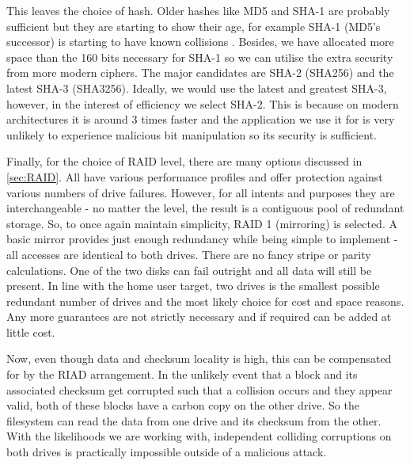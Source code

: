         This leaves the choice of hash. Older hashes like MD5 and SHA-1
        \cite{sha1} are probably sufficient but they are starting to show their
        age, for example SHA-1 (MD5's successor) is starting to have known
        collisions \cite{SHA_collision}. Besides, we have allocated more space
        than the 160 bits necessary for SHA-1 so we can utilise the extra
        security from more modern ciphers. The major candidates are SHA-2
        \cite{sha2_analysis} (SHA256) and the latest SHA-3 \cite{sha3}
        (SHA3256). Ideally, we would use the latest and greatest SHA-3, however,
        in the interest of efficiency we select SHA-2.  This is because on
        modern architectures it is around 3 times faster \cite{hash_stats} and
        the application we use it for is very unlikely to experience malicious
        bit manipulation so its security is sufficient.

        Finally, for the choice of RAID level, there are many options discussed in
        \autoref{sec:RAID}. All have various performance profiles and offer
        protection against various numbers of drive failures. However, for all
        intents and purposes they are interchangeable - no matter the level, the
        result is a contiguous pool of redundant storage. So, to once again
        maintain simplicity, RAID 1 (mirroring) is selected. A basic mirror
        provides just enough redundancy while being simple to implement - all
        accesses are identical to both drives. There are no fancy stripe or
        parity calculations. One of the two disks can fail outright and all
        data will still be present. In line with the home user target, two
        drives is the smallest possible redundant number of drives and the most
        likely choice for cost and space reasons. Any more guarantees are not
        strictly necessary and if required can be added at little cost.

        Now, even though data and checksum locality is high, this can be
        compensated for by the RIAD arrangement. In the unlikely event that a
        block and its associated checksum get corrupted such that a collision
        occurs and they appear valid, both of these blocks have a carbon copy
        on the other drive. So the filesystem can read the data from one drive
        and its checksum from the other. With the likelihoods we are working
        with, independent colliding corruptions on both drives is practically
        impossible outside of a malicious attack.

